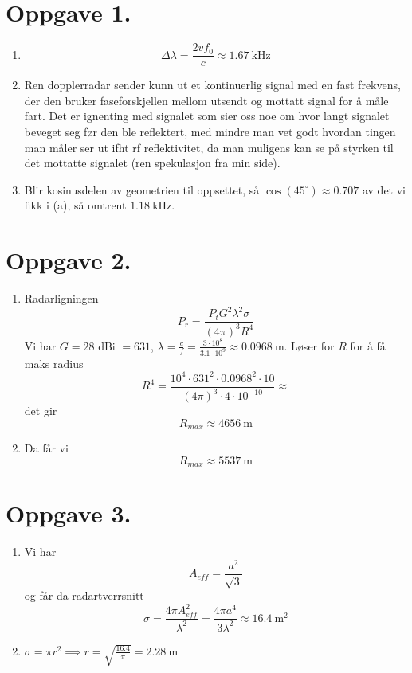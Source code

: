 \documentclass[a4paper,11pt,norsk]{article}
\begin{document}


\section*{Oppgave 1.}
\begin{enumerate}
    \item 
        \[
            \Delta \lambda = \frac{2v f_0}{c} \approx \SI{1.67}{\kilo\hertz}
        \]
    \item Ren dopplerradar sender kunn ut et kontinuerlig signal med en fast frekvens, der den
        bruker faseforskjellen mellom utsendt og mottatt signal for å måle fart. Det er ignenting med signalet 
        som sier oss noe om hvor langt signalet beveget seg før den ble reflektert, med mindre man vet godt hvordan tingen
        man måler ser ut ifht rf reflektivitet, da man muligens kan se på styrken til det mottatte signalet (ren spekulasjon fra min side).
    \item Blir kosinusdelen av geometrien til oppsettet, så $\cos(45^\circ) \approx 0.707$ av det vi fikk i (a),
        så omtrent $\SI{1.18}{\kilo\hertz}$.
\end{enumerate}

\section*{Oppgave 2.}
\begin{enumerate}
    \item Radarligningen
        \[
            P_r = \frac{P_t G^2 \lambda^2 \sigma}{(4\pi)^3 R^4}
        \]
        Vi har $G = 28 \text{ dBi } = 631$, $\lambda = \frac{c}{f} = \frac{3 \cdot 10^8}{3.1 \cdot 10^9} \approx \SI{0.0968}{\meter}$. 
        Løser for $R$ for å få maks radius 
        \[
            R^4 = \frac{10^4 \cdot 631^2 \cdot 0.0968^2 \cdot 10}{(4\pi)^3 \cdot 4 \cdot 10^{-10}} \approx
        \]
        det gir
        \[
            R_{max} \approx \SI{4656}{\meter}
        \]
    \item 
        Da får vi
        \[
            R_{max} \approx \SI{5537}{\meter}
        \]
\end{enumerate}

\section*{Oppgave 3.}
\begin{enumerate}
    \item Vi har
        \[
            A_{eff} = \frac{a^2}{\sqrt{3}}
        \]
        og får da radartverrsnitt
        \[
            \sigma = \frac{4\pi A_{eff}^2}{\lambda^2} = \frac{4\pi a^4}{3\lambda^2} \approx \SI{16.4}{\meter^2}
        \]
    \item $\sigma = \pi r^2 \implies r = \sqrt{\frac{16.4}{\pi}} = \SI{2.28}{\meter}$
\end{enumerate}
\end{document}
